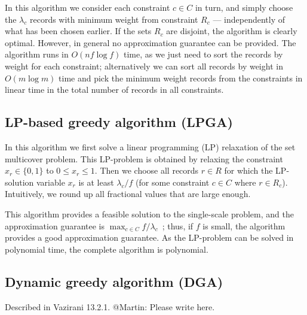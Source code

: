 In this algorithm we consider each constraint $c \in C$ in turn, and simply choose the $\lambda_c$ records with minimum weight from constraint $R_c$ --- independently of what has been chosen earlier. If the sets $R_c$ are disjoint, the algorithm is clearly optimal. However, in general no approximation guarantee can be provided. The algorithm runs in $O(n f \log f)$ time, as we just need to sort the records by weight for each constraint; alternatively we can sort all records by weight in $O(m \log m)$ time and pick the minimum weight records from the constraints in linear time in the total number of records in all constraints.

\subsection{LP-based greedy algorithm (LPGA)}

In this algorithm we first solve a linear programming (LP) relaxation of the set multicover problem. This LP-problem is obtained by relaxing the constraint $x_r \in \{0, 1\}$ to $0 \leq x_r \leq 1$. Then we choose all records $r \in R$ for which the LP-solution variable $x_r$ is at least $\lambda_c / f$ (for some constraint $c \in C$ where $r \in R_c$). Intuitively, we round up all fractional values that are large enough. 

This algorithm provides a feasible solution to the single-scale problem, and the approximation guarantee is $\max_{c \in C} f / \lambda_c$~\cite{something}; thus, if $f$ is small, the algorithm provides a good approximation guarantee. As the LP-problem can be solved in polynomial time, the complete algorithm is polynomial.

\subsection{Dynamic greedy algorithm (DGA)}

Described in Vazirani 13.2.1. @Martin: Please write here.


